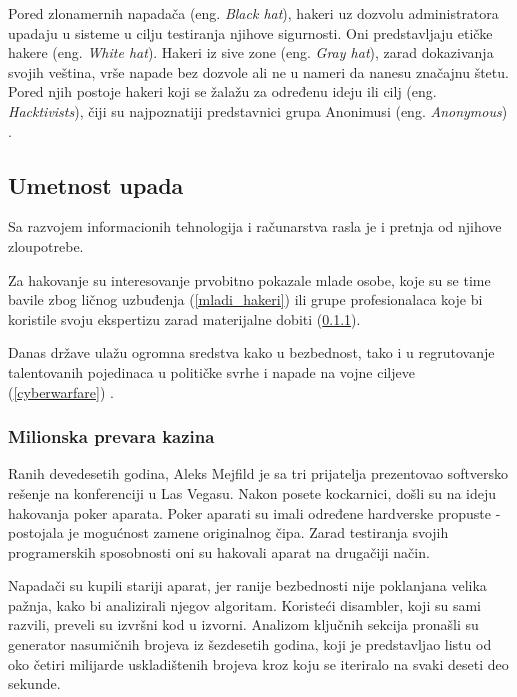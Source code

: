 \documentclass[a4paper]{article}
\begin{document}
Pored zlonamernih napadača (eng. \textit{Black hat}), hakeri uz dozvolu administratora upadaju u sisteme u cilju testiranja njihove sigurnosti. Oni predstavljaju etičke hakere (eng. \textit{White hat}). Hakeri iz sive zone (eng. \textit{Gray hat}), zarad dokazivanja svojih veština, vrše napade bez dozvole ali ne u nameri da nanesu značajnu štetu. Pored njih postoje hakeri koji se žalažu za određenu ideju ili cilj (eng. \textit{Hacktivists}), čiji su najpoznatiji predstavnici grupa Anonimusi (eng. \textit{Anonymous}) \cite{hackers_hat}.
 
\subsection{Umetnost upada}
\label{sec:intrusion}

Sa razvojem informacionih tehnologija i računarstva rasla je i pretnja od njihove zloupotrebe. 

Za hakovanje su interesovanje prvobitno pokazale mlade osobe, koje su se time bavile zbog ličnog uzbuđenja (\ref{mladi_hakeri}) ili grupe profesionalaca koje bi koristile svoju ekspertizu zarad materijalne dobiti (\ref{milionska_prevara_kazina}).

Danas države ulažu ogromna sredstva kako u bezbednost, tako i u regrutovanje talentovanih pojedinaca u političke svrhe i napade na vojne ciljeve (\ref{cyberwarfare}) \cite{intrusion}.

\subsubsection{Milionska prevara kazina}
\label{milionska_prevara_kazina}

Ranih devedesetih godina, Aleks Mejfild je sa tri prijatelja prezentovao softversko rešenje na konferenciji u Las Vegasu. Nakon posete kockarnici, došli su na ideju hakovanja poker aparata. Poker aparati su imali određene hardverske propuste - postojala je mogućnost zamene originalnog čipa. Zarad testiranja svojih programerskih sposobnosti oni su hakovali aparat na drugačiji način.

Napadači su kupili stariji aparat, jer ranije bezbednosti nije poklanjana velika pažnja, kako bi analizirali njegov algoritam. Koristeći disambler, koji su sami razvili, preveli su izvršni kod u izvorni. Analizom ključnih sekcija pronašli su generator nasumičnih brojeva iz šezdesetih godina, koji je predstavljao listu od oko četiri milijarde uskladištenih brojeva kroz koju se iteriralo na svaki deseti deo sekunde.
\end{document}
